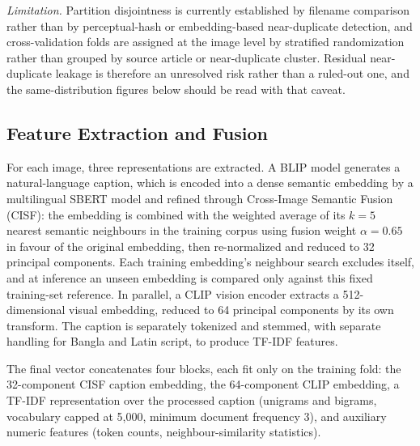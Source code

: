 \documentclass[conference,a4paper]{IEEEtran}
\begin{document}
\emph{Limitation.} Partition disjointness is currently established by
filename comparison rather than by perceptual-hash or embedding-based
near-duplicate detection, and cross-validation folds are assigned at the image
level by stratified randomization rather than grouped by source article or
near-duplicate cluster. Residual near-duplicate leakage is therefore an
unresolved risk rather than a ruled-out one, and the same-distribution figures
below should be read with that caveat.

\subsection{Feature Extraction and Fusion}

For each image, three representations are extracted. A BLIP model generates a
natural-language caption, which is encoded into a dense semantic embedding by
a multilingual SBERT model and refined through Cross-Image Semantic Fusion
(CISF): the embedding is combined with the weighted average of its $k=5$
nearest semantic neighbours in the training corpus using fusion weight
$\alpha=0.65$ in favour of the original embedding, then re-normalized and
reduced to 32 principal components. Each training embedding's neighbour search
excludes itself, and at inference an unseen embedding is compared only against
this fixed training-set reference. In parallel, a CLIP vision encoder extracts
a 512-dimensional visual embedding, reduced to 64 principal components by its
own transform. The caption is separately tokenized and stemmed, with separate
handling for Bangla and Latin script, to produce TF-IDF features.

The final vector concatenates four blocks, each fit only on the training fold:
the 32-component CISF caption embedding, the 64-component CLIP embedding, a
TF-IDF representation over the processed caption (unigrams and bigrams,
vocabulary capped at 5{,}000, minimum document frequency 3), and auxiliary
numeric features (token counts, neighbour-similarity statistics).
\end{document}

